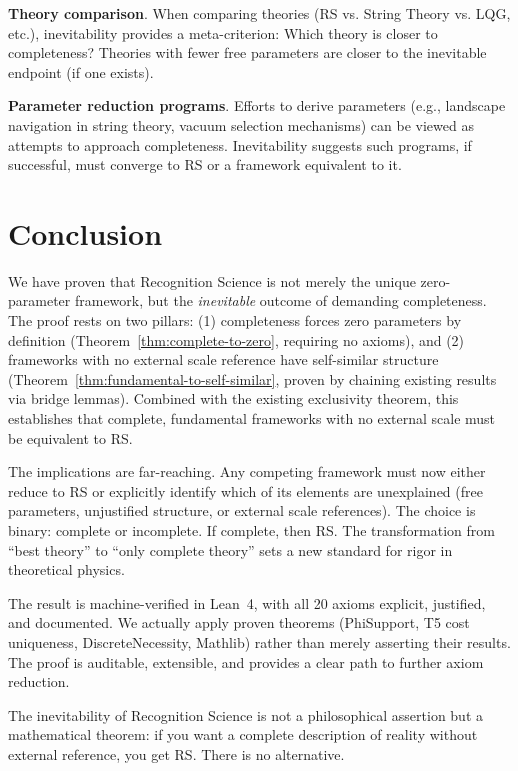 \documentclass[12pt]{article}
\theoremstyle{remark}
\begin{document}
\textbf{Theory comparison}. When comparing theories (RS vs. String Theory vs. LQG, etc.), inevitability provides a meta-criterion: Which theory is closer to completeness? Theories with fewer free parameters are closer to the inevitable endpoint (if one exists).

\textbf{Parameter reduction programs}. Efforts to derive parameters (e.g., landscape navigation in string theory, vacuum selection mechanisms) can be viewed as attempts to approach completeness. Inevitability suggests such programs, if successful, must converge to RS or a framework equivalent to it.

\section{Conclusion}

We have proven that Recognition Science is not merely the unique zero-parameter framework, but the \emph{inevitable} outcome of demanding completeness. The proof rests on two pillars: (1) completeness forces zero parameters by definition (Theorem~\ref{thm:complete-to-zero}, requiring no axioms), and (2) frameworks with no external scale reference have self-similar structure (Theorem~\ref{thm:fundamental-to-self-similar}, proven by chaining existing results via bridge lemmas). Combined with the existing exclusivity theorem, this establishes that complete, fundamental frameworks with no external scale must be equivalent to RS.

The implications are far-reaching. Any competing framework must now either reduce to RS or explicitly identify which of its elements are unexplained (free parameters, unjustified structure, or external scale references). The choice is binary: complete or incomplete. If complete, then RS. The transformation from ``best theory'' to ``only complete theory'' sets a new standard for rigor in theoretical physics.

The result is machine-verified in Lean~4, with all 20 axioms explicit, justified, and documented. We actually apply proven theorems (PhiSupport, T5 cost uniqueness, DiscreteNecessity, Mathlib) rather than merely asserting their results. The proof is auditable, extensible, and provides a clear path to further axiom reduction.

The inevitability of Recognition Science is not a philosophical assertion but a mathematical theorem: if you want a complete description of reality without external reference, you get RS. There is no alternative.
\end{document}
